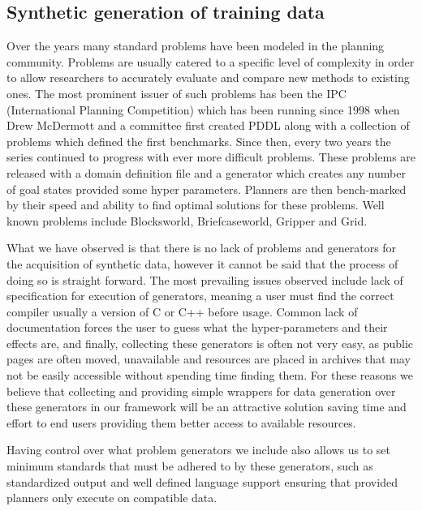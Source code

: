 \subsection{Synthetic generation of training data}
Over the years many standard problems have been modeled in the planning community. Problems are usually catered to a specific level of complexity in order to allow researchers to accurately evaluate and compare new methods to existing ones. The most prominent issuer of such problems has been the IPC (International Planning Competition) which has been running since 1998 when Drew McDermott and a committee first created PDDL along with a collection of problems which defined the first benchmarks. Since then, every two years the series continued to progress with ever more difficult problems. These problems are released with a domain definition file and a generator which creates any number of goal states provided some hyper parameters. Planners are then bench-marked by their speed and ability to find optimal solutions for these problems. Well known problems include Blocksworld, Briefcaseworld, Gripper and Grid.

What we have observed is that there is no lack of problems and generators for the acquisition of synthetic data, however it cannot be said that the process of doing so is straight forward. The most prevailing issues observed include lack of specification for execution of generators, meaning a user must find the correct compiler usually a version of C or C++ before usage. Common lack of documentation forces the user to guess what the hyper-parameters and their effects are, and finally, collecting these generators is often not very easy, as public pages are often moved, unavailable and resources are placed in archives that may not be easily accessible without spending time finding them. For these reasons we believe that collecting and providing simple wrappers for data generation over these generators in our framework will be an attractive solution saving time and effort to end users providing them better access to available resources.

Having control over what problem generators we include also allows us to set minimum standards that must be adhered to by these generators, such as standardized output and well defined language support ensuring that provided planners only execute on compatible data.

